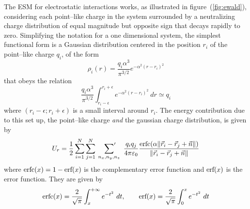 The \ac{ESM} for electrostatic interactions works, as illustrated in figure~(\ref{fig:ewald}), considering each point--like charge in the system surrounded by a neutralizing charge distribution of equal magnitude but opposite sign that decays rapidly to zero. Simplifying the notation for a one dimensional system, the simplest functional form is a Gaussian distribution centered in the position $r_i$ of the point--like charge $q_i$, of the form
\begin{equation}
	\rho_i(r) = \frac{q_i\alpha^3}{\pi^{3/2}}e^{-\alpha^2 (r - r_i)^2}
\end{equation}
that obeys the relation
\begin{equation*}
	\frac{q_i\alpha^3}{\pi^{3/2}}\int_{r_i-\epsilon}^{r_i+\epsilon}e^{-\alpha^2 (r - r_i)^2}\ dr \simeq q_i
\end{equation*}
where $(r_i-\epsilon; r_i+\epsilon)$ is a small interval around $r_i$. The energy contribution due to this set up, the point--like charge \textit{and} the gaussian charge distribution, is given by
\begin{equation}
	U_r = \frac{1}{2}\sum_{i=1}^N\sum_{j=1}^N\ \sideset{}{'}\sum_{n_x,n_y,n_z}\ \frac{q_iq_j}{4 \pi \varepsilon_0} \frac{\erfc{(\alpha \| \vec r_i - \vec r_j + \vec n \|)}}{\| \vec r_i - \vec r_j + \vec n \|}
	\label{eq:ewaldReal}
\end{equation}
where $\text{erfc}(x) = 1-\text{erf}(x)$ is the complementary error function and $\text{erf}(x)$ is the error function. They are given by
\begin{equation}
	\text{erfc}(x) = \frac{2}{\sqrt{\pi}}\int_{x}^{+\infty} e^{-t^2}\ dt, \qquad \text{erf}(x) = \frac{2}{\sqrt{\pi}}\int_{0}^{x} e^{-t^2}\ dt
	\label{eq:erf}
\end{equation}

